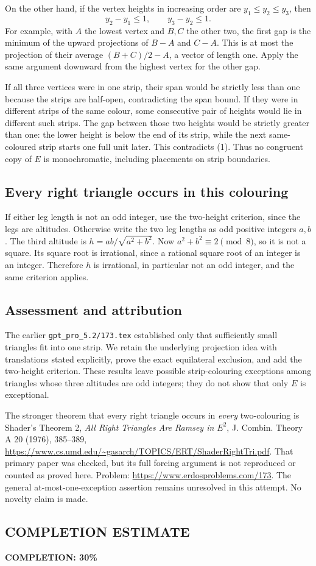 On the other hand, if the vertex heights in increasing order are
$y_1\le y_2\le y_3$, then
\[
 y_2-y_1\le1,\qquad y_3-y_2\le1. \tag{1}
\]
For example, with $A$ the lowest vertex and $B,C$ the other two, the first gap is the minimum of the upward projections of $B-A$ and $C-A$. This is at most the projection of their average
$(B+C)/2-A$, a vector of length one. Apply the same argument downward from the highest vertex for the other gap.

If all three vertices were in one strip, their span would be strictly less than one because the strips are half-open, contradicting the span bound. If they were in different strips of the same colour, some consecutive pair of heights would lie in different such strips. The gap between those two heights would be strictly greater than one: the lower height is below the end of its strip, while the next same-coloured strip starts one full unit later. This contradicts (1). Thus no congruent copy of $E$ is monochromatic, including placements on strip boundaries.

\subsection*{Every right triangle occurs in this colouring}
If either leg length is not an odd integer, use the two-height criterion, since the legs are altitudes. Otherwise write the two leg lengths as odd positive integers $a,b$. The third altitude is
$h=ab/\sqrt{a^2+b^2}$. Now $a^2+b^2\equiv2\pmod8$, so it is not a square. Its square root is irrational, since a rational square root of an integer is an integer. Therefore $h$ is irrational, in particular not an odd integer, and the same criterion applies.

\subsection*{Assessment and attribution}
The earlier \texttt{gpt\_pro\_5.2/173.tex} established only that sufficiently small triangles fit into one strip. We retain the underlying projection idea with translations stated explicitly, prove the exact equilateral exclusion, and add the two-height criterion. These results leave possible strip-colouring exceptions among triangles whose three altitudes are odd integers; they do not show that only $E$ is exceptional.

The stronger theorem that every right triangle occurs in \emph{every} two-colouring is Shader's Theorem 2, \emph{All Right Triangles Are Ramsey in $E^2$}, J. Combin. Theory A 20 (1976), 385--389, \url{https://www.cs.umd.edu/~gasarch/TOPICS/ERT/ShaderRightTri.pdf}. That primary paper was checked, but its full forcing argument is not reproduced or counted as proved here. Problem: \url{https://www.erdosproblems.com/173}. The general at-most-one-exception assertion remains unresolved in this attempt. No novelty claim is made.
\subsection*{COMPLETION ESTIMATE}
\textbf{COMPLETION: 30\%}
